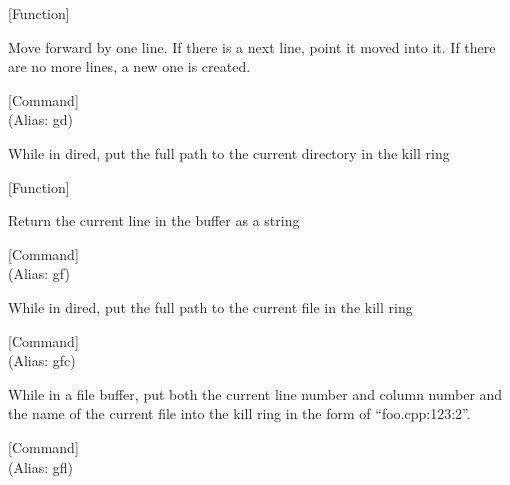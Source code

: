 \vspace{1em}
\noindent
{}
\usebox{\funcname}
 \hfill [Function]

\begin{doc-string}
Move forward by one line.  If there is a next line, point it moved into
it.  If there are no more lines, a new one is created.
\end{doc-string}

\vspace{1em}
\noindent
{}
\usebox{\funcname}
 \hfill [Command]\\%
 (Alias: gd)

\begin{doc-string}
While in dired, put the full path to the current directory in the kill ring
\end{doc-string}

\vspace{1em}
\noindent
{}
\usebox{\funcname}
 \hfill [Function]

\begin{doc-string}
Return the current line in the buffer as a string
\end{doc-string}

\vspace{1em}
\noindent
{}
\usebox{\funcname}
 \hfill [Command]\\%
 (Alias: gf)

\begin{doc-string}
While in dired, put the full path to the current file in the kill ring
\end{doc-string}

\vspace{1em}
\noindent
{}
\usebox{\funcname}
 \hfill [Command]\\%
 (Alias: gfc)

\begin{doc-string}
While in a file buffer, put both the current line number and
column number and the name of the current file into the kill ring
in the form of ``foo.cpp:123:2''.
\end{doc-string}

\vspace{1em}
\noindent
{}
\usebox{\funcname}
 \hfill [Command]\\%
 (Alias: gfl)

